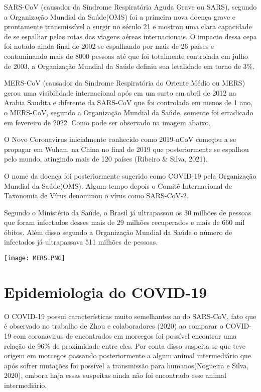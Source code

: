 SARS-CoV (causador da Síndrome Respiratória Aguda Grave ou SARS), segundo a Organização Mundial da Saúde(OMS) foi a primeira nova doença grave e prontamente transmissível a surgir no século 21 e mostrou uma clara capacidade de se espalhar pelas rotas das viagens aéreas internacionais. O impacto dessa cepa foi notado ainda final de 2002 se espalhando por mais de 26 países e contaminando mais de 8000 pessoas até que foi totalmente controlada em julho de 2003, a Organização Mundial da Saúde definiu sua letalidade em torno de 3\%.

MERS-CoV (causador da Síndrome Respiratória do Oriente Médio ou MERS) gerou uma visibilidade internacional após em um surto em abril de 2012 na Arabia Saudita e diferente da SARS-CoV que foi controlada em menos de 1 ano, o MERS-CoV, segundo a Organização Mundial da Saúde, somente foi erradicado em fevereiro de 2022. Como pode ser observado na imagem abaixo.

O Novo Coronavirus inicialmente conhecido como 2019-nCoV começou a se propagar em Wuhan, na China no final de 2019 que posteriormente se espalhou pelo mundo, atingindo mais de 120 países (Ribeiro & Silva, 2021).

O nome da doença foi posteriormente sugerido como COVID-19 pela Organização Mundial da Saúde(OMS). Algum tempo depois o Comitê Internacional de Taxonomia de Vírus denominou o vírus como SARS-CoV-2.

Segundo o Ministério da Saúde, o Brasil já ultrapassou os 30 milhões de pessoas que foram infectados desses mais de 29 milhões recuperados e mais de 660 mil óbitos. Além disso segundo a Organização Mundial da Saúde o número de infectados já ultrapassava 511 milhões de pessoas.

\texttt{[image: MERS.PNG]}

\section{Epidemiologia do COVID-19}

O COVID-19 possui características muito semelhantes ao do SARS-CoV, fato que é observado no trabalho de Zhou e colaboradores (2020) ao comparar o COVID-19 com coronavirus de encontrados em morcegos foi possível encontrar uma relação de 96\% de proximidade entre eles. Por conta disso suspeita-se que teve origem em morcegos passando posteriormente a algum animal intermediário que após sofrer mutações foi possível a transmissão para humanos(Nogueira e Silva, 2020), embora haja essas suspeitas ainda não foi encontrado esse animal intermediário. 

